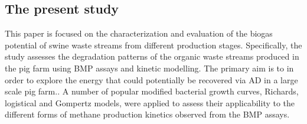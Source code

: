 \subsection{The present study}
This paper is focused on the characterization and evaluation of the biogas potential of swine waste streams from different production stages. Specifically, the study assesses the degradation patterns of the organic waste streams produced in the pig farm using BMP assays and kinetic modelling. The primary aim is to in order to explore the energy that could potentially be recovered via AD in a large scale pig farm.. A number of popular modified bacterial growth curves, Richards, logistical and Gompertz models, were applied to assess their applicability to the different forms of methane production kinetics observed from the BMP assays.